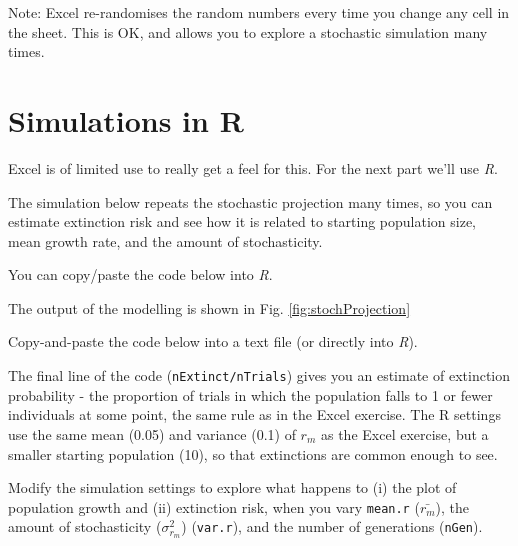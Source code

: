 \documentclass[
  a4paper]{book}
\begin{document}
Note: Excel re-randomises the random numbers every time you change any cell in the sheet. This is OK, and allows you to explore a stochastic simulation many times.

\section{Simulations in R}\label{simulations-in-r}

Excel is of limited use to really get a feel for this. For the next part we'll use \emph{R}.

The simulation below repeats the stochastic projection many times, so you can estimate extinction risk and see how it is related to starting population size, mean growth rate, and the amount of stochasticity.

You can copy/paste the code below into \emph{R}.

The output of the modelling is shown in Fig. \ref{fig:stochProjection}

Copy-and-paste the code below into a text file (or directly into \emph{R}).

The final line of the code (\texttt{nExtinct/nTrials}) gives you an estimate of extinction probability - the proportion of trials in which the population falls to 1 or fewer individuals at some point, the same rule as in the Excel exercise. The R settings use the same mean (0.05) and variance (0.1) of \(r_m\) as the Excel exercise, but a smaller starting population (10), so that extinctions are common enough to see.

Modify the simulation settings to explore what happens to (i) the plot of population growth and (ii) extinction risk, when you vary \texttt{mean.r} (\(\bar{r_m}\)), the amount of stochasticity (\(\sigma_{r_m}^2\)) (\texttt{var.r}), and the number of generations (\texttt{nGen}).
\end{document}
